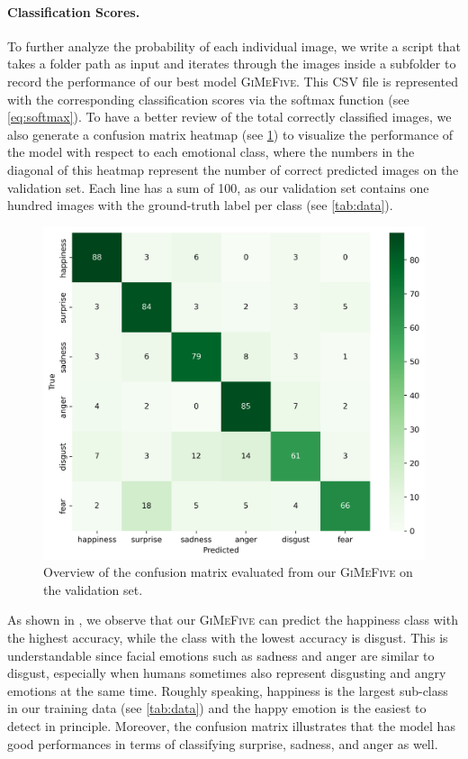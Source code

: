 \paragraph{Classification Scores.} 
To further analyze the probability of each individual image, 
we write a script that takes a folder path as input and iterates through the images inside a subfolder to record the performance of our best model \textsc{GiMeFive}. 
This CSV file is represented with the corresponding classification scores via the softmax function (see \cref{eq:softmax}). 
To have a better review of the total correctly classified images, 
we also generate a confusion matrix heatmap (see \cref{fig:matval}) to visualize the performance of the model with respect to each emotional class, 
where the numbers in the diagonal of this heatmap represent the number of correct predicted images on the validation set. 
Each line has a sum of 100, 
as our validation set contains one hundred images with the ground-truth label per class (see \cref{tab:data}). 

\begin{figure}[ht]
  \centering
   \includegraphics[width=\linewidth]{matval.png}
   \caption{Overview of the confusion matrix evaluated from our \textsc{GiMeFive} on the validation set.} 
   \label{fig:matval}
\end{figure}

As shown in , 
we observe that our \textsc{GiMeFive} can predict the happiness class with the highest accuracy, 
while the class with the lowest accuracy is disgust. 
This is understandable since facial emotions such as sadness and anger are similar to disgust, 
especially when humans sometimes also represent disgusting and angry emotions at the same time. 
Roughly speaking, 
happiness is the largest sub-class in our training data (see \cref{tab:data}) and the happy emotion is the easiest to detect in principle. 
Moreover, 
the confusion matrix illustrates that the model has good performances in terms of classifying surprise, sadness, and anger as well. 

